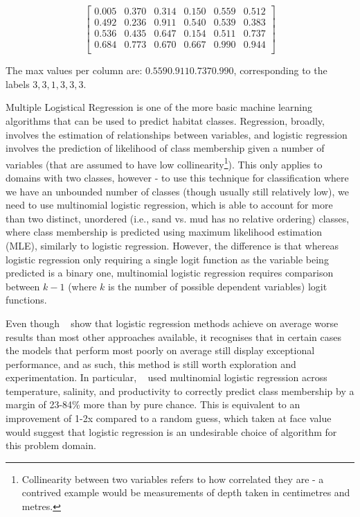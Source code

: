 \[
\begin{bmatrix}
    0.005 &  0.370 &  0.314 &  0.150 &  0.559 &  0.512\\
    0.492 &  0.236 &  0.911 &  0.540 &  0.539 &  0.383\\
    0.536 &  0.435 &  0.647 &  0.154 &  0.511 &  0.737\\
    0.684 &  0.773 &  0.670 &  0.667 &  0.990 &  0.944\\
\end{bmatrix}
\]

The max values per column are: $0.559 0.911 0.737 0.990$, corresponding to the labels $3, 3, 1, 3, 3, 3$.

Multiple Logistical Regression is one of the more basic machine learning algorithms that can be used to predict habitat classes. Regression, broadly, involves the estimation of relationships between variables, and logistic regression involves the prediction of likelihood of class membership given a number of variables (that are assumed to have low collinearity\footnote{Collinearity between two variables refers to how correlated they are - a contrived example would be measurements of depth taken in centimetres and metres.}). This only applies to domains with two classes, however - to use this technique for classification where we have an unbounded  number of classes (though usually still relatively low), we need to use multinomial logistic regression, which is able to account for more than two distinct, unordered (i.e., sand vs. mud has no relative ordering) classes, where class membership is predicted using maximum likelihood estimation (MLE), similarly to logistic regression. However, the difference is that whereas logistic regression only requiring a single logit function as the variable being predicted is a binary one, multinomial logistic regression requires comparison between $k-1$ (where $k$ is the number of possible dependent variables) logit functions. 

Even though ~\citet{caruana06} show that logistic regression methods achieve on average worse results than most other approaches available, it recognises that in certain cases the models that perform most poorly on average still display exceptional performance, and as such, this method is still worth exploration and experimentation. In particular, ~\citet{belanger12} used multinomial logistic regression across temperature, salinity, and productivity to correctly predict class membership by a margin of 23-84\% more than by pure chance. This is equivalent to an improvement of 1-2x compared to a random guess, which taken at face value would suggest that logistic regression is an undesirable choice of algorithm for this problem domain.


